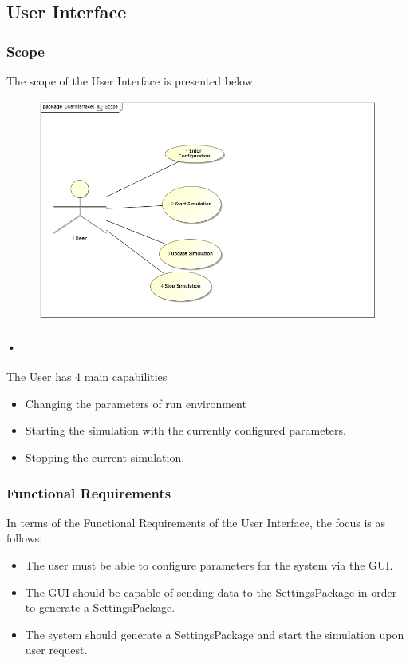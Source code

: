 \documentclass[11pt]{article}
\begin{document}
\subsection{User Interface}
\subsubsection{Scope}
The scope of the User Interface is presented below.
\begin{figure}[H]
	\includegraphics[scale=0.45]{GUI_Scope.jpg}
\end{figure}

\paragraph{•}
The User has 4 main capabilities
\begin{itemize}
	\item Changing the parameters of run environment
	\item Starting the simulation with the currently configured parameters.
	\item Stopping the current simulation.
\end{itemize}

\subsubsection{Functional Requirements}
In terms of the Functional Requirements of the User Interface, the focus is as follows:
\begin{itemize}
	\item The user must be able to configure parameters for the system via the GUI.
	\item The GUI should be capable of sending data to the SettingsPackage in order to generate a SettingsPackage.
	\item The system should generate a SettingsPackage and start the simulation upon user request.
\end{itemize}
\end{document}
